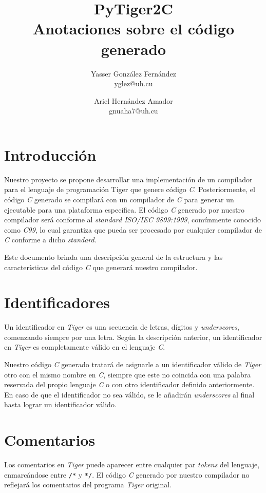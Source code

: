 \documentclass{article}
\title{
    \LARGE{PyTiger2C} \\
    \Large{Anotaciones sobre el código generado}
}
\author{
    Yasser González Fernández \\
    \small{yglez@uh.cu}
    \and
    Ariel Hernández Amador \\
    \small{gnuaha7@uh.cu}
}
\date{}
\begin{document}
\maketitle

\thispagestyle{empty}

\newpage

\setcounter{page}{1}

\section{Introducción}

Nuestro proyecto se propone desarrollar una implementación de un compilador para
el lenguaje de programación Tiger que genere código \emph{C}. Posteriormente, el
código \emph{C} generado se compilará con un compilador de \emph{C} para generar
un ejecutable para una plataforma específica. El código \emph{C} generado por
nuestro compilador será conforme al \emph{standard} \emph{ISO/IEC 9899:1999},
comúnmente conocido como \emph{C99}, lo cual garantiza que pueda ser procesado
por cualquier compilador de \emph{C} conforme a dicho \emph{standard}.

Este documento brinda una descripción general de la estructura y las
características del código \emph{C} que generará nuestro compilador.

\section{Identificadores}

Un identificador en \textit{Tiger} es una secuencia de letras, dígitos y
\textit{underscores}, comenzando siempre por una letra. Según la descripción
anterior, un identificador en \textit{Tiger} es completamente válido en el
lenguaje \textit{C}.

Nuestro código \textit{C} generado tratará de asignarle a un identificador
válido de \textit{Tiger} otro con el mismo nombre en \textit{C}, siempre que
este no coincida con una palabra reservada del propio lenguaje \textit{C} o con
otro identificador definido anteriormente. En caso de que el identificador no
sea válido, se le añadirán \textit{underscores} al final hasta lograr un
identificador válido.

\section{Comentarios}

Los comentarios en \textit{Tiger} puede aparecer entre cualquier par
\textit{tokens} del lenguaje, enmarcándose entre \texttt{/*} y \texttt{*/}. El
código \textit{C} generado por nuestro compilador no reflejará los comentarios
del programa \textit{Tiger} original.
\end{document}
